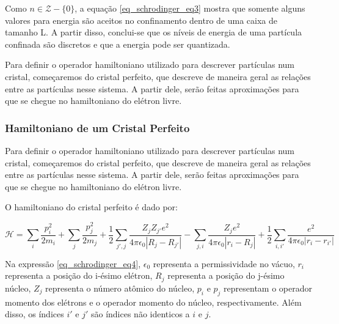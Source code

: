    \par Como $n \in \mathcal{Z} - \{0\}$, a equação \eqref{eq_schrodinger_eq3} mostra que somente alguns valores para energia são aceitos no confinamento dentro de uma caixa de tamanho L. A partir disso, conclui-se que os níveis de energia de uma partícula confinada são discretos e que a energia pode ser quantizada\cite{frustrado2}.

    \par Para definir o operador hamiltoniano utilizado para descrever partículas num cristal, começaremos do cristal perfeito, que descreve de maneira geral as relações entre as partículas nesse sistema. A partir dele, serão feitas aproximações para que se chegue no hamiltoniano do elétron livre\cite{qm_fis2}.

    \subsubsection{Hamiltoniano de um Cristal Perfeito}

      \par Para definir o operador hamiltoniano utilizado para descrever partículas num cristal, começaremos do cristal perfeito, que descreve de maneira geral as relações entre as partículas nesse sistema. A partir dele, serão feitas aproximações para que se chegue no hamiltoniano do elétron livre\cite{qm_fis2}. 
    
      \par O hamiltoniano do cristal perfeito\cite{frustrado3} é dado por:

      \begin{equation}\label{eq_schrodinger_eq4}
        \mathcal{H} = 
          \sum_{i} \frac{p_{i}^2}{2m_{i}} 
          + \sum_{j} \frac{p_{j}^2}{2m_{j}} 
          + \frac{1}{2} \sum_{j', j} \frac{Z_{j} Z_{j'} e^2}{4\pi\epsilon_{0}\left|R_{j} - R_{j'}\right|}-  \sum_{j, i} \frac{Z_{j} e^2}{4\pi\epsilon_{0}\left|r_{i} - R_{j}\right|} 
          + \frac{1}{2} \sum_{i, i'} \frac{e^2}{4\pi\epsilon_{0}\left|r_{i} - r_{i'}\right|}
      \end{equation}

      \par Na expressão \eqref{eq_schrodinger_eq4}, $\epsilon_{0}$ representa a permissividade no vácuo, $r_{i}$ representa a posição do i-ésimo elétron, $R_{j}$ representa a posição do j-ésimo núcleo, $Z_{j}$ representa o número atômico do núcleo, $p_{i}$ e $p_{j}$ representam o operador momento dos elétrons e o operador momento do núcleo, respectivamente. Além disso, os índices $i'$ e $j'$ são índices não identicos a $i$ e $j$.

